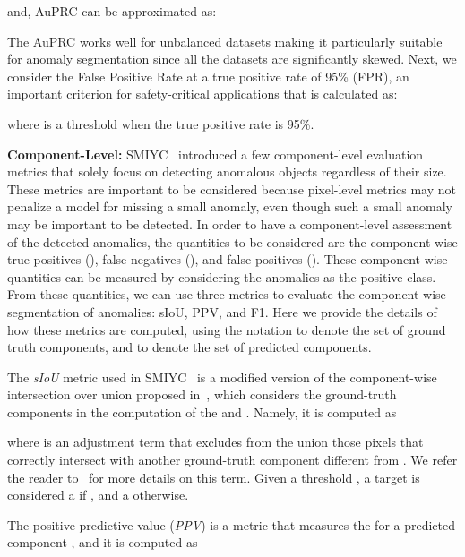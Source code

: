 \documentclass[10pt,twocolumn,letterpaper]{article}
\begin{document}
\noindent and, AuPRC can be approximated as:


The AuPRC works well for unbalanced datasets making it particularly suitable for anomaly segmentation since all the datasets are significantly skewed. Next, we consider the False Positive Rate at a true positive rate of 95\% (FPR), an important criterion for safety-critical applications that is calculated as:


where  is a threshold when the true positive rate is 95\%.


\noindent\textbf{Component-Level:} SMIYC~\cite{chan2021segmentmeifyoucan} introduced a few component-level evaluation metrics that solely focus on detecting anomalous objects regardless of their size. These metrics are important to be considered because pixel-level metrics may not penalize a model for missing a small anomaly, even though such a small anomaly may be important to be detected. In order to have a component-level assessment of the detected anomalies, the quantities to be considered are the component-wise true-positives (), false-negatives (), and false-positives (). These component-wise quantities can be measured by considering the anomalies as the positive class. From these quantities, we can use three metrics to evaluate the component-wise segmentation of anomalies: sIoU, PPV, and F1. Here we provide the details of how these metrics are computed, using the notation  to denote the set of ground truth components, and  to denote the set of predicted components.


The \textit{sIoU} metric used in SMIYC~\cite{chan2021segmentmeifyoucan} is a modified version of the component-wise intersection over union proposed in~\cite{rottmann2020prediction}, which considers the ground-truth components in the computation of the  and . Namely, it is computed as 

where  is an adjustment term that excludes from the union those pixels that correctly intersect with another ground-truth component different from . We refer the reader to~\cite{chan2021segmentmeifyoucan} for more details on this term.
Given a threshold , a target  is considered a  if , and a  otherwise.

The positive predictive value (\textit{PPV}) is a metric that measures the  for a predicted component , and it is computed as 
\end{document}
